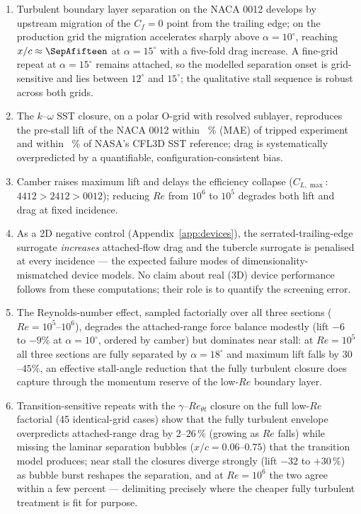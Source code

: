 \documentclass[11pt,a4paper]{article}
\begin{document}
\begin{enumerate}
  \item Turbulent boundary layer separation on the NACA 0012 develops by upstream migration of the $C_f=0$ point from the trailing edge; on the production grid the migration accelerates sharply above $\alpha = 10^\circ$, reaching $x/c \approx \SepAfifteen$ at $\alpha = 15^\circ$ with a five-fold drag increase. A fine-grid repeat at $\alpha = 15^\circ$ remains attached, so the modelled separation onset is grid-sensitive and lies between $12^\circ$ and $15^\circ$; the qualitative stall sequence is robust across both grids.
  \item The $k$--$\omega$ SST closure, on a polar O-grid with resolved sublayer, reproduces the pre-stall lift of the NACA 0012 within \ClMAEpct{}~\% (MAE) of tripped experiment and within \CflThreeDClPct{}~\% of NASA's CFL3D SST reference; drag is systematically overpredicted by a quantifiable, configuration-consistent bias.
  \item Camber raises maximum lift and delays the efficiency collapse ($C_{L,\max}$: $4412 > 2412 > 0012$); reducing $Re$ from $10^6$ to $10^5$ degrades both lift and drag at fixed incidence.
  \item As a 2D negative control (Appendix~\ref{app:devices}), the serrated-trailing-edge surrogate \emph{increases} attached-flow drag and the tubercle surrogate is penalised at every incidence --- the expected failure modes of dimensionality-mismatched device models. No claim about real (3D) device performance follows from these computations; their role is to quantify the screening error.
  \item The Reynolds-number effect, sampled factorially over all three sections ($Re = 10^5$--$10^6$), degrades the attached-range force balance modestly (lift $-6$ to $-9\%$ at $\alpha = 10^\circ$, ordered by camber) but dominates near stall: at $Re = 10^5$ all three sections are fully separated by $\alpha = 18^\circ$ and maximum lift falls by $30$--$45\%$, an effective stall-angle reduction that the fully turbulent closure does capture through the momentum reserve of the low-$Re$ boundary layer.
  \item Transition-sensitive repeats with the $\gamma$--$Re_{\theta t}$ closure on the full low-$Re$ factorial (45 identical-grid cases) show that the fully turbulent envelope overpredicts attached-range drag by $2$--$26\,\%$ (growing as $Re$ falls) while missing the laminar separation bubbles ($x/c = 0.06$--$0.75$) that the transition model produces; near stall the closures diverge strongly (lift $-32$ to $+30\,\%$) as bubble burst reshapes the separation, and at $Re = 10^6$ the two agree within a few percent --- delimiting precisely where the cheaper fully turbulent treatment is fit for purpose.

\end{enumerate}
\end{document}
